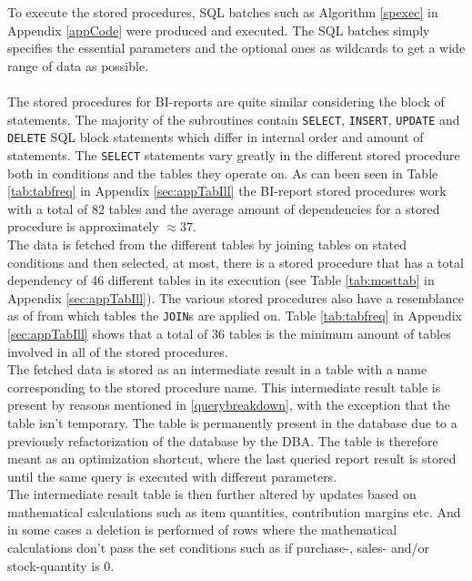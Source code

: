 \documentclass{cslthse-msc}
\begin{document}
\noindent To execute the stored procedures, SQL batches such as Algorithm \ref{spexec} in Appendix \ref{appCode} were produced and executed. The SQL batches simply specifies the essential parameters and the optional ones as wildcards to get a wide range of data as possible.\\\\  
The stored procedures for BI-reports are quite similar considering the block of statements. The majority of the subroutines contain \texttt{SELECT}, \texttt{INSERT}, \texttt{UPDATE} and \texttt{DELETE} SQL block statements which differ in internal order and amount of statements. The \texttt{SELECT} statements vary greatly in the different stored procedure both in conditions and the tables they operate on. As can been seen in Table \ref{tab:tabfreq} in Appendix \ref{sec:appTabIll} the BI-report stored procedures work with a total of 82 tables and the average amount of dependencies for a stored procedure is approximately $\approx37$.\\
The data is fetched from the different tables by joining tables on stated conditions and then selected, at most, there is a stored procedure that has a total dependency of 46 different tables in its execution (see Table \ref{tab:mosttab} in Appendix \ref{sec:appTabIll}). The various stored procedures also have a resemblance as of from which tables the \texttt{JOIN}s are applied on. Table \ref{tab:tabfreq} in Appendix \ref{sec:appTabIll} shows that a total of 36 tables is the minimum amount of tables involved in all of the stored procedures.\\
The fetched data is stored as an intermediate result in a table with a name corresponding to the stored procedure name. This intermediate result table is present by reasons mentioned in \ref{querybreakdown}, with the exception that the table isn't temporary. The table is permanently present in the database due to a previously refactorization of the database by the DBA. The table is therefore meant as an optimization shortcut, where the last queried report result is stored until the same query is executed with different parameters.\\
The intermediate result table is then further altered by updates based on mathematical calculations such as item quantities, contribution margins etc. And in some cases a deletion is performed of rows where the mathematical calculations don't pass the set conditions such as if purchase-, sales- and/or stock-quantity is 0.   
       
\end{document}
